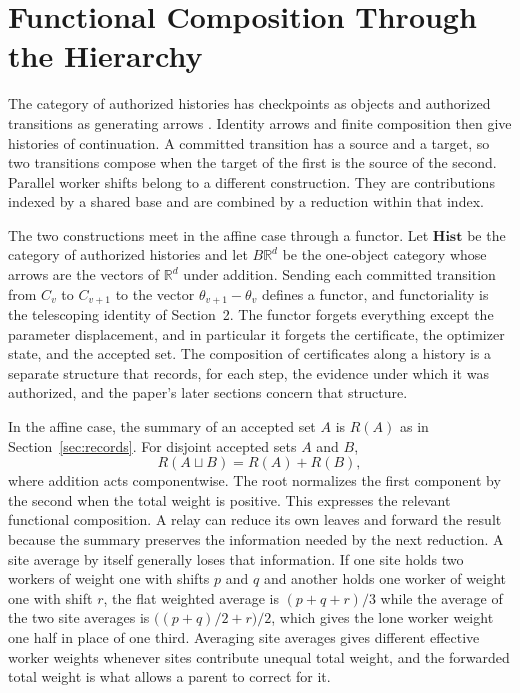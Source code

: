 \documentclass[11pt]{article}
\theoremstyle{definition}
\theoremstyle{remark}
\begin{document}
\section{Functional Composition Through the Hierarchy}\label{sec:composition}

The category of authorized histories has checkpoints as objects and authorized transitions as generating arrows \cite{awodey2010}. Identity arrows and finite composition then give histories of continuation. A committed transition has a source and a target, so two transitions compose when the target of the first is the source of the second. Parallel worker shifts belong to a different construction. They are contributions indexed by a shared base and are combined by a reduction within that index.

The two constructions meet in the affine case through a functor. Let $\mathbf{Hist}$ be the category of authorized histories and let $B\mathbb{R}^d$ be the one-object category whose arrows are the vectors of $\mathbb{R}^d$ under addition. Sending each committed transition from $C_v$ to $C_{v+1}$ to the vector $\theta_{v+1}-\theta_v$ defines a functor, and functoriality is the telescoping identity of Section~2. The functor forgets everything except the parameter displacement, and in particular it forgets the certificate, the optimizer state, and the accepted set. The composition of certificates along a history is a separate structure that records, for each step, the evidence under which it was authorized, and the paper's later sections concern that structure.

In the affine case, the summary of an accepted set $A$ is $R(A)$ as in Section~\ref{sec:records}. For disjoint accepted sets $A$ and $B$,
\[
R(A\sqcup B)=R(A)+R(B),
\]
where addition acts componentwise. The root normalizes the first component by the second when the total weight is positive. This expresses the relevant functional composition. A relay can reduce its own leaves and forward the result because the summary preserves the information needed by the next reduction. A site average by itself generally loses that information. If one site holds two workers of weight one with shifts $p$ and $q$ and another holds one worker of weight one with shift $r$, the flat weighted average is $(p+q+r)/3$ while the average of the two site averages is $\bigl((p+q)/2+r\bigr)/2$, which gives the lone worker weight one half in place of one third. Averaging site averages gives different effective worker weights whenever sites contribute unequal total weight, and the forwarded total weight is what allows a parent to correct for it.
\end{document}
